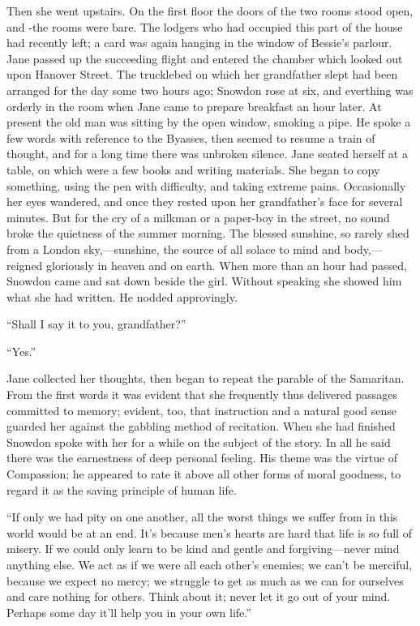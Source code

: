 Then she went upstairs. On the first floor the doors of the two rooms
stood open, and -the rooms were bare. The lodgers who had occupied this
part of the house had recently left; a card was again hanging in the
window of Bessie's parlour. Jane passed up the succeeding flight and
entered the chamber which looked out upon Hanover Street. The trucklebed
on which her grandfather slept had been arranged for the day some two
hours ago; Snowdon rose at six, and everthing was orderly in the room
when Jane came to prepare breakfast an hour later. At present the old
man was sitting by the open window, smoking a pipe. He spoke a few words
with reference to the Byasses, then seemed to resume a train of thought,
and for a long time there was unbroken silence. Jane seated herself at a
table, on which were a few books and writing materials. She began to
copy something, using the pen with difficulty, and taking extreme
{\protect\hypertarget{241}{}{}}pains. Occasionally her eyes wandered,
and once they rested upon her grandfather's face for several minutes.
But for the cry of a milkman or a paper-boy in the street, no sound
broke the quietness of the summer morning. The blessed sunshine, so
rarely shed from a London sky,---sunshine, the source of all solace to
mind and body,---reigned gloriously in heaven and on earth. When more
than an hour had passed, Snowdon came and sat down beside the girl.
Without speaking she showed him what she had written. He nodded
approvingly.

``Shall I say it to you, grandfather?''

``Yes.''

Jane collected her thoughts, then began to repeat the parable of the
Samaritan. From the first words it was evident that she frequently thus
delivered passages committed to memory; evident, too, that instruction
and a natural good sense guarded her against the gabbling method of
recitation. When she had finished Snowdon spoke with her for a while on
the subject of the story. In all he said there was
{\protect\hypertarget{242}{}{}}the earnestness of deep personal feeling.
His theme was the virtue of Compassion; he appeared to rate it above all
other forms of moral goodness, to regard it as the saving principle of
human life.

``If only we had pity on one another, all the worst things we suffer
from in this world would be at an end. It's because men's hearts are
hard that life is so full of misery. If we could only learn to be kind
and gentle and forgiving---never mind anything else. We act as if we
were all each other's enemies; we can't be merciful, because we expect
no mercy; we struggle to get as much as we can for ourselves and care
nothing for others. Think about it; never let it go out of your mind.
Perhaps some day it'll help you in your own life.''

